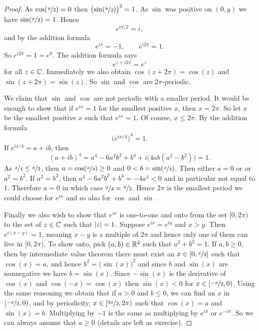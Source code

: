 \begin{proof}
As $\cos(\nicefrac{\pi}{2}) = 0$ then
${\bigl(\sin(\nicefrac{\pi}{2})\bigr)}^2 = 1$.
As $\sin$ was positive on $(0,y)$ we have
$\sin(\nicefrac{\pi}{2}) = 1$.
Hence
\begin{equation*}
e^{i \pi /2} = i ,
\end{equation*}
and by the addition formula 
\begin{equation*}
e^{i \pi} = -1 ,
\qquad 
e^{i 2\pi} = 1 .
\end{equation*}
So $e^{i2\pi} = 1 = e^0$.  The addition formula says
\begin{equation*}
e^{z+i2\pi} = e^z
\end{equation*}
for all $z \in {\mathbb{C}}$.  Immediately we also obtain
$\cos(z+2\pi) = \cos(z)$ and $\sin(z+2\pi) = \sin(z)$.
So $\sin$ and $\cos$ are $2\pi$-periodic.

We claim that $\sin$ and $\cos$ are not periodic with a smaller period.  It
would be enough to show that if $e^{ix} = 1$ for the
smallest positive $x$, then
$x = 2\pi$.  So let $x$ be the smallest positive $x$ such that
$e^{ix} = 1$.
Of course, $x \leq 2\pi$.
By the addition formula
\begin{equation*}
{\bigl(e^{ix/4}\bigr)}^4 = 1 .
\end{equation*}
If $e^{ix/4} = a+ib$, then
\begin{equation*}
{(a+ib)}^4
=a^4-6a^2b^2+b^4 + i\bigl(4ab(a^2-b^2)\bigr)
=1 .
\end{equation*}
As $\nicefrac{x}{4} \leq \nicefrac{\pi}{2}$, then $a = \cos(\nicefrac{x}{4}) \geq 0$ and
$0 < b = \sin(\nicefrac{x}{4})$.  Then either $a = 0$ or
or $a^2 = b^2$.  If $a^2=b^2$, then
$a^4-6a^2b^2+b^4 = -4a^4 < 0$ and in particular not equal to 1.
Therefore $a=0$ in which case $\nicefrac{x}{4} = \nicefrac{\pi}{2}$.
Hence $2\pi$ is the smallest period we could choose for $e^{ix}$
and so also for $\cos$ and $\sin$.

Finally we also wish to show that $e^{ix}$ is one-to-one and onto
from the set $[0,2\pi)$ to the set of $z \in {\mathbb{C}}$ such that
$\lvert {z} \rvert = 1$.  Suppose $e^{ix} = e^{iy}$ and 
$x > y$.  Then
$e^{i(x-y)} = 1$, meaning $x-y$ is a multiple of $2\pi$ and hence
only one of them can live in $[0,2\pi)$.
To show onto, pick $(a,b) \in {\mathbb{R}}^2$ such that $a^2+b^2 = 1$.
If $a,b \geq 0$, then by intermediate value theorem
there must exist an $x \in [0,\nicefrac{\pi}{2}]$ such that
$\cos(x) = a$, and hence $b^2 = \bigl(\sin(x)\bigr)^2$ and since
$b$ and $\sin(x)$ are nonnegative we have $b = \sin(x)$.
Since $-\sin(x)$ is the derivative of $\cos(x)$
and $\cos(-x) = \cos(x)$ then $\sin(x) < 0$ for $x \in [\nicefrac{-\pi}{2},0)$.
Using the same reasoning we obtain that
if $a > 0$ and $b \leq 0$, we can find an $x$ in $[\nicefrac{-\pi}{2},0)$,
and by periodicity,
$x \in [\nicefrac{3\pi}{2},2\pi)$ such that $\cos(x) = a$ and $\sin(x)=b$.
Multiplying by $-1$ is the same as multiplying by $e^{i\pi}$ or
$e^{-i\pi}$.  So we can always assume that $a \geq 0$ (details are left
as exercise).
\end{proof}

